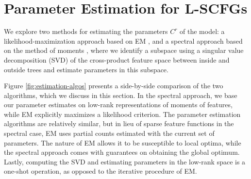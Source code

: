 \documentclass[11pt]{article}
\begin{document}
\section{Parameter Estimation for L-SCFGs}
\label{sec:estimation}
We explore two methods for estimating the parameters $C^r$ of the model: a likelihood-maximization approach based on EM \cite{Dempster1977}, and a spectral approach based on the method of moments \cite{Hsu2009,cohen-14b}, where we identify a subspace using a singular value decomposition (SVD)
of the cross-product feature space between inside and outside trees and estimate parameters in this subspace. 

Figure \ref{fig:estimation-algos} presents a side-by-side comparison of the two algorithms, which we discuss in this section.  
In the spectral approach, we base our parameter estimates on low-rank representations of moments of features, while EM explicitly maximizes a likelihood criterion. 
The parameter estimation algorithms are relatively similar, but in lieu of sparse feature functions in the spectral case, EM uses partial counts estimated with the current set of parameters.  
The nature of EM allows it to be susceptible to local optima, while the spectral approach comes with guarantees on obtaining the global optimum. 
Lastly, computing the SVD and estimating parameters in the low-rank space is a one-shot operation, as opposed to the iterative procedure of EM. 
\end{document}
